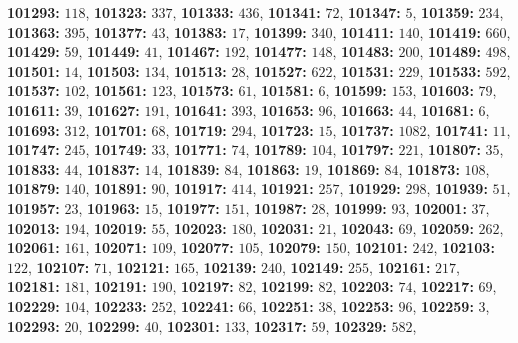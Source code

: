 \textsf{\bfseries 101293:} $118$, \textsf{\bfseries 101323:} $337$, \textsf{\bfseries 101333:} $436$, \textsf{\bfseries 101341:} $72$, \textsf{\bfseries 101347:} $5$, \textsf{\bfseries 101359:} $234$, \textsf{\bfseries 101363:} $395$, \textsf{\bfseries 101377:} $43$, \textsf{\bfseries 101383:} $17$, \textsf{\bfseries 101399:} $340$, \textsf{\bfseries 101411:} $140$, \textsf{\bfseries 101419:} $660$, \textsf{\bfseries 101429:} $59$, \textsf{\bfseries 101449:} $41$, \textsf{\bfseries 101467:} $192$, \textsf{\bfseries 101477:} $148$, \textsf{\bfseries 101483:} $200$, \textsf{\bfseries 101489:} $498$, \textsf{\bfseries 101501:} $14$, \textsf{\bfseries 101503:} $134$, \textsf{\bfseries 101513:} $28$, \textsf{\bfseries 101527:} $622$, \textsf{\bfseries 101531:} $229$, \textsf{\bfseries 101533:} $592$, \textsf{\bfseries 101537:} $102$, \textsf{\bfseries 101561:} $123$, \textsf{\bfseries 101573:} $61$, \textsf{\bfseries 101581:} $6$, \textsf{\bfseries 101599:} $153$, \textsf{\bfseries 101603:} $79$, \textsf{\bfseries 101611:} $39$, \textsf{\bfseries 101627:} $191$, \textsf{\bfseries 101641:} $393$, \textsf{\bfseries 101653:} $96$, \textsf{\bfseries 101663:} $44$, \textsf{\bfseries 101681:} $6$, \textsf{\bfseries 101693:} $312$, \textsf{\bfseries 101701:} $68$, \textsf{\bfseries 101719:} $294$, \textsf{\bfseries 101723:} $15$, \textsf{\bfseries 101737:} $1082$, \textsf{\bfseries 101741:} $11$, \textsf{\bfseries 101747:} $245$, \textsf{\bfseries 101749:} $33$, \textsf{\bfseries 101771:} $74$, \textsf{\bfseries 101789:} $104$, \textsf{\bfseries 101797:} $221$, \textsf{\bfseries 101807:} $35$, \textsf{\bfseries 101833:} $44$, \textsf{\bfseries 101837:} $14$, \textsf{\bfseries 101839:} $84$, \textsf{\bfseries 101863:} $19$, \textsf{\bfseries 101869:} $84$, \textsf{\bfseries 101873:} $108$, \textsf{\bfseries 101879:} $140$, \textsf{\bfseries 101891:} $90$, \textsf{\bfseries 101917:} $414$, \textsf{\bfseries 101921:} $257$, \textsf{\bfseries 101929:} $298$, \textsf{\bfseries 101939:} $51$, \textsf{\bfseries 101957:} $23$, \textsf{\bfseries 101963:} $15$, \textsf{\bfseries 101977:} $151$, \textsf{\bfseries 101987:} $28$, \textsf{\bfseries 101999:} $93$, \textsf{\bfseries 102001:} $37$, \textsf{\bfseries 102013:} $194$, \textsf{\bfseries 102019:} $55$, \textsf{\bfseries 102023:} $180$, \textsf{\bfseries 102031:} $21$, \textsf{\bfseries 102043:} $69$, \textsf{\bfseries 102059:} $262$, \textsf{\bfseries 102061:} $161$, \textsf{\bfseries 102071:} $109$, \textsf{\bfseries 102077:} $105$, \textsf{\bfseries 102079:} $150$, \textsf{\bfseries 102101:} $242$, \textsf{\bfseries 102103:} $122$, \textsf{\bfseries 102107:} $71$, \textsf{\bfseries 102121:} $165$, \textsf{\bfseries 102139:} $240$, \textsf{\bfseries 102149:} $255$, \textsf{\bfseries 102161:} $217$, \textsf{\bfseries 102181:} $181$, \textsf{\bfseries 102191:} $190$, \textsf{\bfseries 102197:} $82$, \textsf{\bfseries 102199:} $82$, \textsf{\bfseries 102203:} $74$, \textsf{\bfseries 102217:} $69$, \textsf{\bfseries 102229:} $104$, \textsf{\bfseries 102233:} $252$, \textsf{\bfseries 102241:} $66$, \textsf{\bfseries 102251:} $38$, \textsf{\bfseries 102253:} $96$, \textsf{\bfseries 102259:} $3$, \textsf{\bfseries 102293:} $20$, \textsf{\bfseries 102299:} $40$, \textsf{\bfseries 102301:} $133$, \textsf{\bfseries 102317:} $59$, \textsf{\bfseries 102329:} $582$, 

